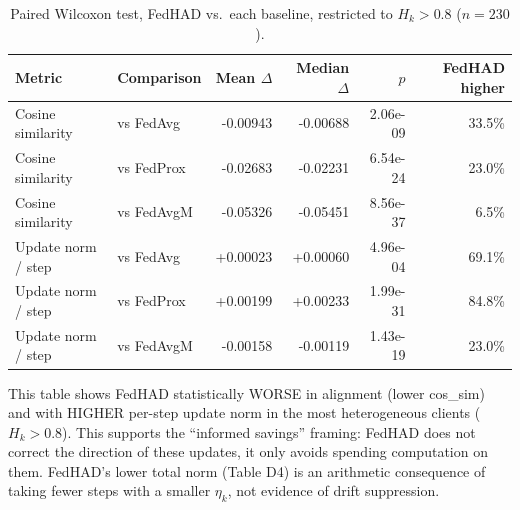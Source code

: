 \begin{table}[t]
\centering
\caption{Paired Wilcoxon test, FedHAD vs.\ each baseline, restricted to $H_k>0.8$ ($n=230$).}
\label{tab:d3-wilcoxon-hi}
\begin{tabular}{llrrrr}
\toprule
Metric & Comparison & Mean $\Delta$ & Median $\Delta$ & $p$ & FedHAD higher \\
\midrule
Cosine similarity & vs FedAvg & -0.00943 & -0.00688 & 2.06e-09 & 33.5\% \\
Cosine similarity & vs FedProx & -0.02683 & -0.02231 & 6.54e-24 & 23.0\% \\
Cosine similarity & vs FedAvgM & -0.05326 & -0.05451 & 8.56e-37 & 6.5\% \\
Update norm / step & vs FedAvg & +0.00023 & +0.00060 & 4.96e-04 & 69.1\% \\
Update norm / step & vs FedProx & +0.00199 & +0.00233 & 1.99e-31 & 84.8\% \\
Update norm / step & vs FedAvgM & -0.00158 & -0.00119 & 1.43e-19 & 23.0\% \\
\bottomrule
\end{tabular}
\begin{tablenotes}
\footnotesize
\item This table shows FedHAD statistically WORSE in alignment (lower cos\_sim) and with HIGHER per-step update norm in the most heterogeneous clients ($H_k>0.8$). This supports the ``informed savings'' framing: FedHAD does not correct the direction of these updates, it only avoids spending computation on them. FedHAD's lower total norm (Table D4) is an arithmetic consequence of taking fewer steps with a smaller $\eta_k$, not evidence of drift suppression.
\end{tablenotes}
\end{table}
